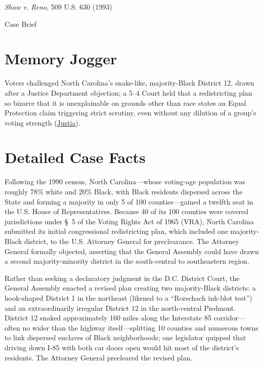 \documentclass[12pt]{article}
\begin{document}
\begin{center}
{\LARGE \textit{Shaw v. Reno}, 509 U.S. 630 (1993)\par}
\vspace{0.8em}
{\large Case Brief\par}
\end{center}
\vspace{1em}

\section{Memory Jogger}
Voters challenged North Carolina's snake-like, majority-Black District 12, drawn after a Justice Department objection; a 5--4 Court held that a redistricting plan so bizarre that it is unexplainable on grounds other than race states an Equal Protection claim triggering strict scrutiny, even without any dilution of a group's voting strength (\href{https://supreme.justia.com/cases/federal/us/509/630/}{Justia}).

\section{Detailed Case Facts}
Following the 1990 census, North Carolina---whose voting-age population was roughly 78\% white and 20\% Black, with Black residents dispersed across the State and forming a majority in only 5 of 100 counties---gained a twelfth seat in the U.S. House of Representatives. Because 40 of its 100 counties were covered jurisdictions under \S~5 of the Voting Rights Act of 1965 (VRA), North Carolina submitted its initial congressional redistricting plan, which included one majority-Black district, to the U.S. Attorney General for preclearance. The Attorney General formally objected, asserting that the General Assembly could have drawn a second majority-minority district in the south-central to southeastern region.

Rather than seeking a declaratory judgment in the D.C. District Court, the General Assembly enacted a revised plan creating two majority-Black districts: a hook-shaped District 1 in the northeast (likened to a ``Rorschach ink-blot test'') and an extraordinarily irregular District 12 in the north-central Piedmont. District 12 snaked approximately 160 miles along the Interstate 85 corridor---often no wider than the highway itself---splitting 10 counties and numerous towns to link dispersed enclaves of Black neighborhoods; one legislator quipped that driving down I-85 with both car doors open would hit most of the district's residents. The Attorney General precleared the revised plan.
\end{document}
